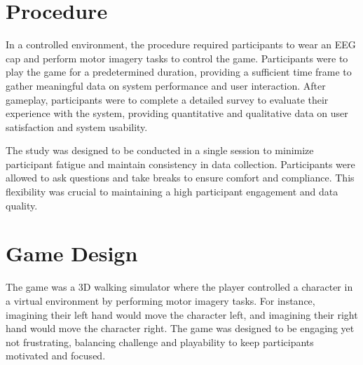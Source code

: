 \section{Procedure}
In a controlled environment, the procedure required participants to wear an EEG cap and perform motor imagery tasks to control the game. 
Participants were to play the game for a predetermined duration, providing a sufficient time frame to gather meaningful data on system performance and user interaction.
After gameplay, participants were to complete a detailed survey to evaluate their experience with the system, providing quantitative and qualitative data on user satisfaction and system usability.

The study was designed to be conducted in a single session to minimize participant fatigue and maintain consistency in data collection. 
Participants were allowed to ask questions and take breaks to ensure comfort and compliance. 
This flexibility was crucial to maintaining a high participant engagement and data quality.

\section{Game Design}
The game was a 3D walking simulator where the player controlled a character in a virtual environment by performing motor imagery tasks.
For instance, imagining their left hand would move the character left, and imagining their right hand would move the character right. 
The game was designed to be engaging yet not frustrating, balancing challenge and playability to keep participants motivated and focused.

